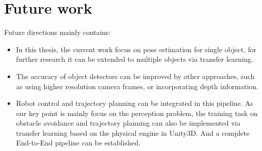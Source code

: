 \section{Future work}
Future directions mainly contains: 
\begin{itemize}
	\item In this thesis, the current work focus on pose estimation for single object, for further research it can be extended to multiple objects via transfer learning.
	\item The accuracy of object detectors can be improved by other approaches, such as using higher resolution camera frames, or incorporating depth information.
	\item Robot control and trajectory planning can be integrated in this pipeline. As our key point is mainly focus on the perception problem, the training task on obstacle avoidance and trajectory planning can also be implemented via transfer learning based on the physical engine in Unity3D. And a complete End-to-End pipeline can be established. 
\end{itemize}
